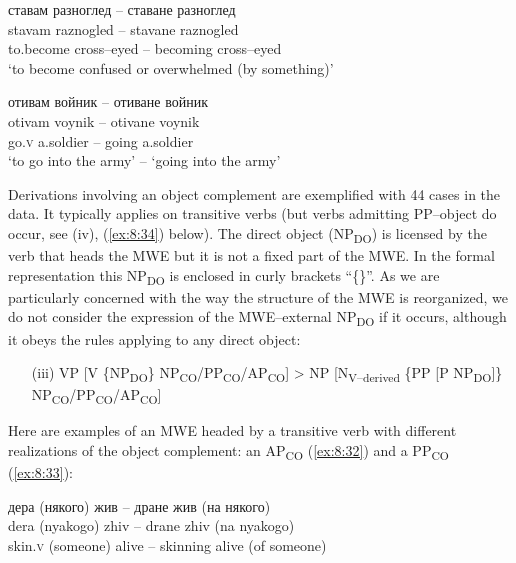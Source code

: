 \documentclass[output=paper]{langsci/langscibook}
\begin{document}
\begin{exe}
\ex \label{ex:8:30}
\settowidth{}
\glll ставам разноглед -- ставане разноглед\\
stavam raznogled -- stavane raznogled\\ 
{to.become} cross–eyed -- becoming cross–eyed \\ 
\glt ‘to become confused or overwhelmed (by something)’
\end{exe}

\begin{exe}
\ex \label{ex:8:31}
\settowidth{}
\glll отивам войник -- отиване войник\\
otivam voynik -- otivane voynik\\
go.\textsc{v} {a.soldier} -- going {a.soldier}\\  
\glt ‘to go into the army’ -- ‘going into the army’
\end{exe}


Derivations involving an object complement are exemplified with 44 cases
in the data. It typically applies on transitive verbs (but verbs
admitting PP–object do occur, see (iv), (\ref{ex:8:34}) below). The direct object
(NP\textsubscript{DO}) is licensed by the verb that heads the MWE but
it is not a fixed part of the MWE. In the formal representation this
NP\textsubscript{DO} is enclosed in curly brackets “\{\}”. As we are
particularly concerned with the way the structure of the MWE is
reorganized, we do not consider the expression of the MWE–external
NP\textsubscript{DO} if it occurs, although it obeys the rules
applying to any direct object:


\renewcommand{\theenumi}{(\roman{enumi})}%
\begin{enumerate}
 \setcounter{enumi}{2}
 \item[(iii)] VP [V \{NP\textsubscript{DO}\}
NP\textsubscript{CO}/PP\textsubscript{CO}/AP\textsubscript{CO}]
 > NP
[N\textsubscript{V–derived} \{PP [P NP\textsubscript{DO}]\}
NP\textsubscript{CO}/\linebreak PP\textsubscript{CO}/AP\textsubscript{CO}]
\end{enumerate}

Here are examples of an MWE headed by a transitive verb with different
realizations of the object complement: an AP\textsubscript{CO} (\ref{ex:8:32}) and
a PP\textsubscript{CO} (\ref{ex:8:33}):

 
\begin{exe}
\ex \label{ex:8:32}
\settowidth{}
\glll дера \textnormal{(}някого\textnormal{)} жив -- дране жив \textnormal{(}на някого\textnormal{)}\\
dera (nyakogo) zhiv -- drane zhiv (na nyakogo)\\ 
 skin.\textsc{v} (someone) alive -- skinning alive (of someone) \\ 
\end{exe}
\end{document}
